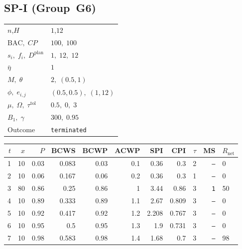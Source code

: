 \documentclass[12pt, a4paper]{article}
\newcommand{\BAC}{\mathrm{BAC}}
\begin{document}
\newpage

\subsection*{SP-I  (Group~G6)}
\begin{center}
\begin{tabular}{ll}
\toprule
$n$,\;$H$ & $1$,\;$12$ \\
$\BAC,\;CP$ & $100,\;100$ \\
$s_i,\;f_i,\;D^{\mathrm{plan}}$ & $1,\;12,\;12$ \\
$\bar\eta$ & $1$ \\
$M,\;\theta$ & $2,\;(0.5,1)$ \\
$\phi,\;e_{i,j}$ & $(0.5,0.5),\;(1,12)$ \\
$\mu,\;\Omega,\;\tau^{\mathrm{tol}}$ & $0.5,\;0,\;3$ \\
$B_1,\;\gamma$ & $300,\;0.95$ \\
Outcome & \texttt{terminated} \\
\bottomrule
\end{tabular}
\end{center}

\begin{center}
\begin{tabular}{rrrrrrrrrrl}
\toprule
$t$ & $x$ & $P$ & BCWS & BCWP & ACWP & SPI & CPI & $\tau$ & MS & $R_{\mathrm{net}}$\\
\midrule
1 & 10 & 0.03 & 0.083 & 0.03 & 0.1 & 0.36 & 0.3 & 2 & \texttt{---} & 0 \\
2 & 10 & 0.06 & 0.167 & 0.06 & 0.2 & 0.36 & 0.3 & 1 & \texttt{---} & 0 \\
3 & 80 & 0.86 & 0.25 & 0.86 & 1 & 3.44 & 0.86 & 3 & \texttt{1} & 50 \\
4 & 10 & 0.89 & 0.333 & 0.89 & 1.1 & 2.67 & 0.809 & 3 & \texttt{---} & 0 \\
5 & 10 & 0.92 & 0.417 & 0.92 & 1.2 & 2.208 & 0.767 & 3 & \texttt{---} & 0 \\
6 & 10 & 0.95 & 0.5 & 0.95 & 1.3 & 1.9 & 0.731 & 3 & \texttt{---} & 0 \\
7 & 10 & 0.98 & 0.583 & 0.98 & 1.4 & 1.68 & 0.7 & 3 & \texttt{---} & 98 \\
\bottomrule
\end{tabular}
\end{center}
\end{document}
